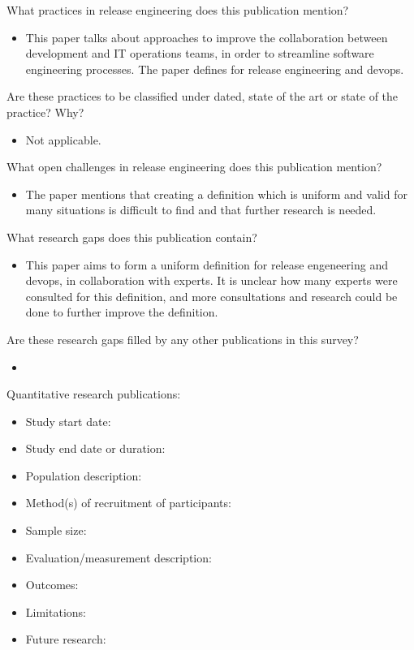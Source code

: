 \documentclass[]{book}
\providecommand{\tightlist}{%
  \setlength{\itemsep}{0pt}\setlength{\parskip}{0pt}}
\begin{document}
What practices in release engineering does this publication mention?

\begin{itemize}
\tightlist
\item
  This paper talks about approaches to improve the collaboration between
  development and IT operations teams, in order to streamline software
  engineering processes. The paper defines for release engineering and
  devops.
\end{itemize}

Are these practices to be classified under dated, state of the art or
state of the practice? Why?

\begin{itemize}
\tightlist
\item
  Not applicable.
\end{itemize}

What open challenges in release engineering does this publication
mention?

\begin{itemize}
\tightlist
\item
  The paper mentions that creating a definition which is uniform and
  valid for many situations is difficult to find and that further
  research is needed.
\end{itemize}

What research gaps does this publication contain?

\begin{itemize}
\tightlist
\item
  This paper aims to form a uniform definition for release engeneering
  and devops, in collaboration with experts. It is unclear how many
  experts were consulted for this definition, and more consultations and
  research could be done to further improve the definition.
\end{itemize}

Are these research gaps filled by any other publications in this survey?

\begin{itemize}
\item
\end{itemize}

Quantitative research publications:

\begin{itemize}
\tightlist
\item
  Study start date:
\item
  Study end date or duration:
\item
  Population description:
\item
  Method(s) of recruitment of participants:
\item
  Sample size:
\item
  Evaluation/measurement description:
\item
  Outcomes:
\item
  Limitations:
\item
  Future research:
\end{itemize}
\end{document}
